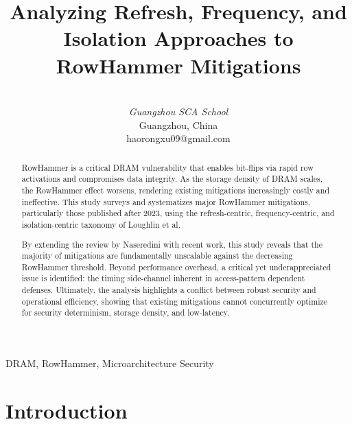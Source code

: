 \documentclass[journal,twocolumn]{IEEEtran}
\begin{document}
\title{Analyzing Refresh, Frequency, and Isolation Approaches to RowHammer Mitigations}
\author{\\
		\textit{Guangzhou SCA School}\\
		Guangzhou, China \\
		haorongxu09@gmail.com}
\maketitle

\begin{abstract}
	RowHammer is a critical DRAM vulnerability that enables bit-flips via rapid row activations and compromises data integrity. As the storage density of DRAM scales, the RowHammer effect worsens, rendering existing mitigations increasingly costly and ineffective. This study surveys and systematizes major RowHammer mitigations, particularly those published after 2023, using the refresh-centric, frequency-centric, and isolation-centric taxonomy of Loughlin et al.
	
	By extending the review by Naseredini with recent work, this study reveals that the majority of mitigations are fundamentally unscalable against the decreasing RowHammer threshold. Beyond performance overhead, a critical yet underappreciated issue is identified: the timing side-channel inherent in access-pattern dependent defenses. Ultimately, the analysis highlights a conflict between robust security and operational efficiency, showing that existing mitigations cannot concurrently optimize for security determinism, storage density, and low-latency.
\end{abstract}

\begin{IEEEkeywords}
	DRAM, RowHammer, Microarchitecture Security
\end{IEEEkeywords}

\section{Introduction}
\end{document}
